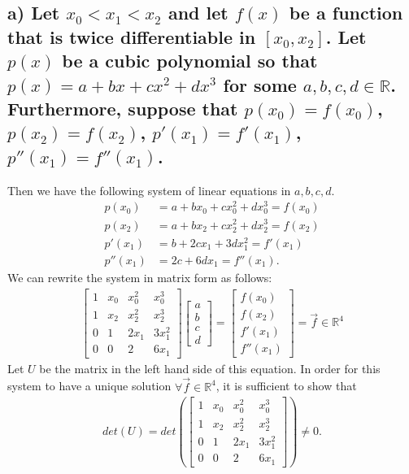 \documentclass[11pt, letterpaper]{article}
\begin{document}
\subsection*{a) \normalfont Let $x_0<x_1<x_2$ and let $f(x)$ be a function that is twice differentiable in $[x_0,x_2]$.
Let $p(x)$ be a cubic polynomial so that $p(x)=a+bx+cx^2+dx^3$ for some $a,b,c,d\in\mathbb{R}$. Furthermore, suppose that $p(x_0)=f(x_0)$,
$p(x_2)=f(x_2)$, $p'(x_1)=f'(x_1)$, $p''(x_1)=f''(x_1)$.}
Then we have the following system of linear equations in $a,b,c,d$.
\begin{align*}
    p(x_0)&=a+bx_0+cx_0^2+dx_0^3=f(x_0)\\
    p(x_2)&=a+bx_2+cx_2^2+dx_2^3=f(x_2)\\
    p'(x_1)&=b+2cx_1+3dx_1^2=f'(x_1)\\
    p''(x_1)&=2c+6dx_1=f''(x_1).
\end{align*}
We can rewrite the system in matrix form as follows:
\begin{align*}
   \begin{bmatrix}
       1 & x_0 & x_0^2 & x_0^3 \\
       1 & x_2 & x_2^2 & x_2^3 \\
       0 & 1 & 2x_1 & 3x_1^2 \\
       0 & 0 & 2 & 6x_1
   \end{bmatrix} 
   \begin{bmatrix}
       a\\
       b\\
       c\\
       d
   \end{bmatrix}
   =
   \begin{bmatrix}
       f(x_0)\\
       f(x_2)\\
       f'(x_1)\\
       f''(x_1)
   \end{bmatrix}
   =\vec{f}\in\mathbb{R}^4
\end{align*}
Let $U$ be the matrix in the left hand side of this equation. In order for this system to have a unique solution $\forall\vec{f}\in\mathbb{R}^4$, it is sufficient to show
that
\begin{align*}
    det(U)=det\left(
   \begin{bmatrix}
       1 & x_0 & x_0^2 & x_0^3 \\
       1 & x_2 & x_2^2 & x_2^3 \\
       0 & 1 & 2x_1 & 3x_1^2 \\
       0 & 0 & 2 & 6x_1
   \end{bmatrix} 
    \right)\neq 0.
\end{align*}
\end{document}
